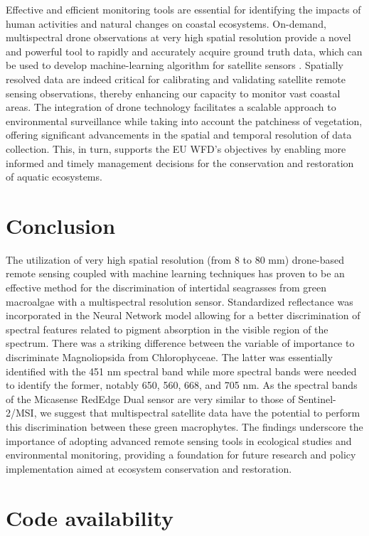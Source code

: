 \documentclass[
  number]{elsarticle}
\begin{document}
Effective and efficient monitoring tools are essential for identifying
the impacts of human activities and natural changes on coastal
ecosystems. On-demand, multispectral drone observations at very high
spatial resolution provide a novel and powerful tool to rapidly and
accurately acquire ground truth data, which can be used to develop
machine-learning algorithm for satellite sensors
\citep{davies2024intertidal}. Spatially resolved data are indeed
critical for calibrating and validating satellite remote sensing
observations, thereby enhancing our capacity to monitor vast coastal
areas. The integration of drone technology facilitates a scalable
approach to environmental surveillance while taking into account the
patchiness of vegetation, offering significant advancements in the
spatial and temporal resolution of data collection. This, in turn,
supports the EU WFD's objectives by enabling more informed and timely
management decisions for the conservation and restoration of aquatic
ecosystems.

\section{Conclusion}\label{conclusion}

The utilization of very high spatial resolution (from 8 to 80 mm)
drone-based remote sensing coupled with machine learning techniques has
proven to be an effective method for the discrimination of intertidal
seagrasses from green macroalgae with a multispectral resolution sensor.
Standardized reflectance was incorporated in the Neural Network model
allowing for a better discrimination of spectral features related to
pigment absorption in the visible region of the spectrum. There was a
striking difference between the variable of importance to discriminate
Magnoliopsida from Chlorophyceae. The latter was essentially identified
with the 451 nm spectral band while more spectral bands were needed to
identify the former, notably 650, 560, 668, and 705 nm. As the spectral
bands of the Micasense RedEdge Dual sensor are very similar to those of
Sentinel-2/MSI, we suggest that multispectral satellite data have the
potential to perform this discrimination between these green
macrophytes. The findings underscore the importance of adopting advanced
remote sensing tools in ecological studies and environmental monitoring,
providing a foundation for future research and policy implementation
aimed at ecosystem conservation and restoration.

\section{Code availability}\label{code-availability}
\end{document}
